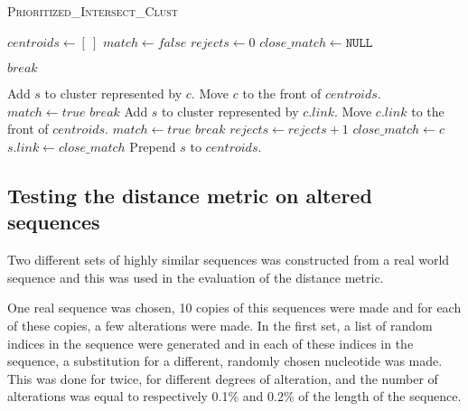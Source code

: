 \begin{algorithm}
  \caption{\textsc{Prioritized\_Intersect\_Clust}}
  \label{alg:intersect_clust}
  \begin{algorithmic}[1]
    \Statex
      \State $centroids \gets [~]$ 
        \State $match \gets false$
        \State $rejects \gets 0$
        \State $close\_match \gets \mathtt{NULL}$

            \State $break$
          \EndIf

          \State{}
              \State Add $s$ to cluster represented by $c$.
              \State Move $c$ to the front of $centroids$.
              \State $match \gets true$
              \State $break$
            \EndIf
            \State
              \State Add $s$ to cluster represented by $c.link$.
              \State Move $c.link$ to the front of $centroids$.
              \State $match \gets true$
              \State $break$
            \EndIf
            \State $rejects \gets rejects + 1$
            \State $close\_match \gets c$
          \EndIf
        \EndFor
        \State
          
            \State $s.link \gets close\_match$
          \EndIf
          \State Prepend $s$ to $centroids$.
        \EndIf
      \EndFor
    \EndFunction
  \end{algorithmic}
\end{algorithm}


\subsection{Testing the distance metric on altered sequences}

Two different sets of highly similar sequences was constructed from a real
world sequence and this was used in the evaluation of the distance metric.

One real sequence was chosen, 10 copies of this sequences were made and for
each of these copies, a few alterations were made. In the first set, a list of
random indices in the sequence were generated and in each of these indices in
the sequence, a substitution for a different, randomly chosen nucleotide was
made. This was done for twice, for different degrees of alteration, and the
number of alterations was equal to respectively 0.1\% and 0.2\% of the length
of the sequence.

